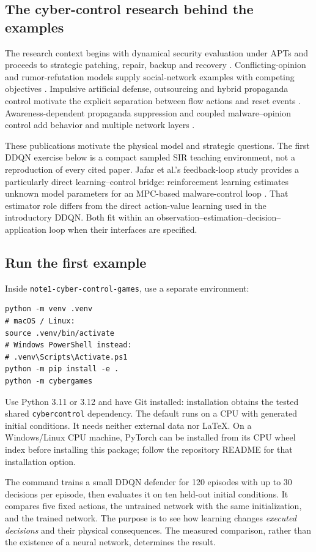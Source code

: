 \documentclass[11pt,a4paper]{article}
\theoremstyle{definition}
\theoremstyle{remark}
\begin{document}
\subsection{The cyber-control research behind the examples}
The research context begins with dynamical security evaluation under APTs and proceeds to strategic patching, repair, backup and recovery \cite{security2017,patch2018,repair2019,backup2021}. Conflicting-opinion and rumor-refutation models supply social-network examples with competing objectives \cite{opinions2020,rumor2021}. Impulsive artificial defense, outsourcing and hybrid propaganda control motivate the explicit separation between flow actions and reset events \cite{impulse2023,outsource2024,war2024}. Awareness-dependent propaganda suppression and coupled malware--opinion control add behavior and multiple network layers \cite{awareness2025,malware2025}.

These publications motivate the physical model and strategic questions. The first DDQN exercise below is a compact sampled SIR teaching environment, not a reproduction of every cited paper. Jafar et al.'s feedback-loop study provides a particularly direct learning--control bridge: reinforcement learning estimates unknown model parameters for an MPC-based malware-control loop \cite{feedback2024}. That estimator role differs from the direct action-value learning used in the introductory DDQN. Both fit within an observation--estimation--decision--application loop when their interfaces are specified.

\subsection{Run the first example}
Inside \texttt{note1-cyber-control-games}, use a separate environment:
\begin{lstlisting}[language={}]
python -m venv .venv
# macOS / Linux:
source .venv/bin/activate
# Windows PowerShell instead:
# .venv\Scripts\Activate.ps1
python -m pip install -e .
python -m cybergames
\end{lstlisting}
Use Python 3.11 or 3.12 and have Git installed: installation obtains the tested shared \texttt{cybercontrol} dependency. The default runs on a CPU with generated initial conditions. It needs neither external data nor LaTeX. On a Windows/Linux CPU machine, PyTorch can be installed from its CPU wheel index before installing this package; follow the repository README for that installation option.

The command trains a small DDQN defender for 120 episodes with up to 30 decisions per episode, then evaluates it on ten held-out initial conditions. It compares five fixed actions, the untrained network with the same initialization, and the trained network. The purpose is to see how learning changes \emph{executed decisions} and their physical consequences. The measured comparison, rather than the existence of a neural network, determines the result.
\end{document}
